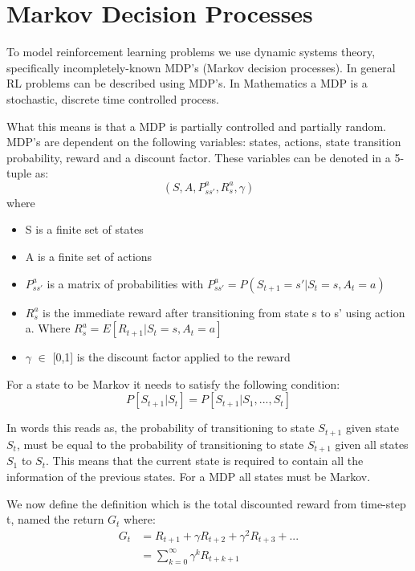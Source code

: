 \graphicspath{{MDP/fig/}}

\chapter{Markov Decision Processes}
\label{chap:MDP}

To model reinforcement learning problems we use dynamic systems theory, specifically incompletely-known MDP's (Markov decision
processes). In general RL problems can be described using MDP's. In Mathematics a MDP is a stochastic, discrete time controlled process.

What this means is that a MDP is partially controlled and partially random. MDP's are dependent on the following variables: states, actions, state transition probability, reward and a discount factor\cite{sutton_barto}. These variables can be denoted in a 5-tuple as:
\[(S,A,P^{a}_{ss'},R^{a}_{s},\gamma)\] where
\begin{itemize}
	\item S is a finite set of states
	\item A is a finite set of actions
	\item $P^{a}_{ss'}$ is a matrix of probabilities with $P^{a}_{ss'} = P(S_{t+1} = s' | S_t = s,A_t = a) $
	\item $R^{a}_{s}$ is the immediate reward after transitioning from state s to s' using action a. Where $R^{a}_{s} = E[R_{t+1}|S_t =s, A_t =a]$
	\item $\gamma$ $\in$ [0,1] is the discount factor applied to the reward
\end{itemize}

For a state to be Markov it needs to satisfy the following condition:
\[P[S_{t+1}|S_{t}] = P[S_{t+1}|S_{1},...,S_{t}]\]

In words this reads as, the probability of transitioning to state $S_{t+1}$ given state $S_t$, must be equal to the probability of transitioning to state $S_{t+1}$ given all states $S_1$ to $S_t$. This means that the current state is required to contain all the information of the previous states. For a MDP all states must be Markov.

We now define the definition which is the total discounted reward from time-step t, named the return $G_t$ where:
\begin{align}
	G_t &= R_{t+1}+\gamma R_{t+2} +\gamma^2 R_{t+3}+ ... \\
	&= \sum_{k=0}^{\infty}\gamma^{k} R_{t+k+1}
	\label{eq:G_t}
\end{align}

